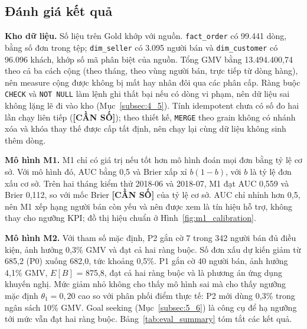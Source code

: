 \documentclass[a4paper]{article}
\begin{document}
\subsection{Đánh giá kết quả}
\label{subsec:6_2}

\textbf{Kho dữ liệu.} Số liệu trên Gold khớp với nguồn. \texttt{fact\_order} có 99.441 dòng, bằng số đơn trong tệp; \texttt{dim\_seller} có 3.095 người bán và \texttt{dim\_customer} có 96.096 khách, khớp số mã phân biệt của nguồn. Tổng GMV bằng 13.494.400,74 theo cả ba cách cộng (theo tháng, theo vùng người bán, trực tiếp từ dòng hàng), nên measure cộng được không bị mất hay nhân đôi qua các phân cấp. Ràng buộc \texttt{CHECK} và \texttt{NOT NULL} làm lệnh ghi thất bại nếu có dòng vi phạm, nên dữ liệu sai không lặng lẽ đi vào kho (Mục~\ref{subsec:4_5}). Tính idempotent chưa có số đo hai lần chạy liên tiếp (\textbf{[CẦN SỐ]}); theo thiết kế, \texttt{MERGE} theo grain không có nhánh xóa và khóa thay thế được cấp tất định, nên chạy lại cùng dữ liệu không sinh thêm dòng.

\textbf{Mô hình M1.} M1 chỉ có giá trị nếu tốt hơn mô hình đoán mọi đơn bằng tỷ lệ cơ sở. Với mô hình đó, AUC bằng 0,5 và Brier xấp xỉ $b(1-b)$, với $b$ là tỷ lệ đơn xấu cơ sở. Trên hai tháng kiểm thử 2018-06 và 2018-07, M1 đạt AUC 0,559 và Brier 0,112, so với mốc Brier \textbf{[CẦN SỐ]} của tỷ lệ cơ sở. AUC chỉ nhỉnh hơn 0,5, nên M1 xếp hạng người bán còn yếu và nên được xem là tín hiệu hỗ trợ, không thay cho ngưỡng KPI; đồ thị hiệu chuẩn ở Hình~\ref{fig:m1_calibration}.

\textbf{Mô hình M2.} Với tham số mặc định, P2 gắn cờ 7 trong 342 người bán đủ điều kiện, ảnh hưởng 0,3\% GMV và đạt cả hai ràng buộc. Số đơn xấu dự kiến giảm từ 685,2 (P0) xuống 682,0, tức khoảng 0,5\%. P1 gắn cờ 40 người bán, ảnh hưởng 4,1\% GMV, $E[B]$ = 875,8, đạt cả hai ràng buộc và là phương án ứng dụng khuyến nghị. Mức giảm nhỏ không cho thấy mô hình sai mà cho thấy ngưỡng mặc định $\theta_1 = 0{,}20$ cao so với phân phối điểm thực tế: P2 mới dùng 0,3\% trong ngân sách 10\% GMV. Goal seeking (Mục~\ref{subsec:5_6}) là công cụ để hạ ngưỡng tới mức vẫn đạt hai ràng buộc. Bảng~\ref{tab:eval_summary} tóm tắt các kết quả.
\end{document}
